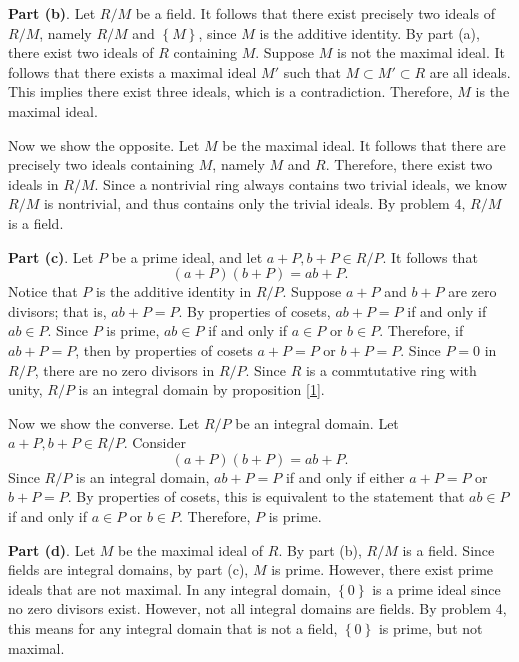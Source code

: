 \documentclass[11pt, letterpaper]{report}
\begin{document}
\noindent \textbf{Part (b)}. Let $R /M$ be a field. It follows that there exist precisely two ideals of $R /M$, namely $R / M$ and $\left\{ M \right\} $, since $M$ is the additive identity. By part (a), there exist two ideals of $R$ containing $M$. Suppose $M$ is not the maximal ideal. It follows that there exists a maximal ideal $M'$ such that $M \subset M' \subset R$ are all ideals. This implies there exist three ideals, which is a contradiction. Therefore, $M$ is the maximal ideal.

Now we show the opposite. Let $M$ be the maximal ideal. It follows that there are precisely two ideals containing $M$, namely $M$ and $R$. Therefore, there exist two ideals in $R /M$. Since a nontrivial ring always contains two trivial ideals,  we know $R /M$ is nontrivial, and thus contains only the trivial ideals. By problem 4, $R /M$ is a field.

\noindent \textbf{Part (c)}. Let $P$ be a prime ideal, and let $a+P,b+P\in R /P$. It follows that
\[
	\left( a+P \right) \left( b+P \right) =ab+P
.\]
Notice that $P$ is the additive identity in $R /P$. Suppose $a+P$ and $b+P$ are zero divisors; that is, $ab+P=P$. By properties of cosets, $ab+P=P$ if and only if $ab\in P$. Since $P$ is prime, $ab\in P$ if and only if $a\in P$ or $b\in P$. Therefore, if $ab+P=P$, then by properties of cosets $a+P=P$ or $b+P=P$. Since $P=0$ in $R /P$, there are no zero divisors in $R /P$. Since $R$ is a commtutative ring with unity, $R /P$ is an integral domain by proposition \ref{1}.

Now we show the converse. Let $R/P$ be an integral domain. Let $a+P,b+P\in R /P$. Consider
\[
	\left( a+P \right) \left( b+P \right) =ab+P
.\]
Since $R /P$ is an integral domain, $ab+P=P$ if and only if either $a+P=P$ or $b+P=P$. By properties of cosets, this is equivalent to the statement that $ab\in P$ if and only if $a\in P$ or $b\in P$. Therefore, $P$ is prime.

\noindent \textbf{Part (d)}. Let $M$ be the maximal ideal of $R$. By part (b), $R /M$ is a field. Since fields are integral domains, by part (c), $M$ is prime. However, there exist prime ideals that are not maximal. In any integral domain, $\left\{ 0 \right\} $ is a prime ideal since no zero divisors exist. However, not all integral domains are fields. By problem 4, this means for any integral domain that is not a field, $\left\{ 0 \right\} $ is prime, but not maximal.
\end{document}
